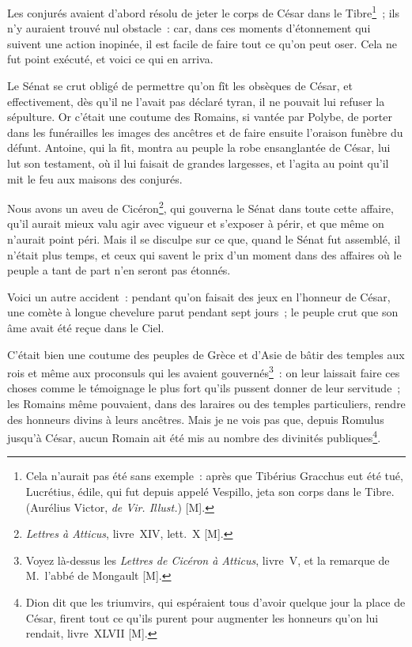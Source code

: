 \documentclass[french,twoside]{book} %
\begin{document}
Les conjurés avaient d’abord résolu de jeter le corps de César dans le Tibre\footnote{Cela n’aurait pas été sans exemple : après que Tibérius Gracchus eut été tué, Lucrétius, édile, qui fut depuis appelé Vespillo, jeta son corps dans le Tibre. (Aurélius Victor, {\itshape de Vir. Illust.}) [M].} ; ils n’y auraient trouvé nul obstacle : car, dans ces moments d’étonnement qui suivent une action inopinée, il est facile de faire tout ce qu’on peut oser. Cela ne fut point exécuté, et voici ce qui en arriva.\par
Le Sénat se crut obligé de permettre qu’on fît les obsèques de César, et effectivement, dès qu’il ne l’avait pas déclaré tyran, il ne pouvait lui refuser la sépulture. Or c’était une coutume des Romains, si vantée par Polybe, de porter dans les funérailles les images des ancêtres et de faire ensuite l’oraison funèbre du défunt. Antoine, qui la fit, montra au peuple la robe ensanglantée de César, lui lut son testament, où il lui faisait de grandes largesses, et l’agita au point qu’il mit le feu aux maisons des conjurés.\par
Nous avons un aveu de Cicéron\footnote{{\itshape Lettres à Atticus}, livre XIV, lett. X [M].}, qui gouverna le Sénat dans toute cette affaire, qu’il aurait mieux valu agir avec vigueur et s’exposer à périr, et que même on n’aurait point péri. Mais il se disculpe sur ce que, quand le Sénat fut assemblé, il n’était plus temps, et ceux qui savent le prix d’un moment dans des affaires où le peuple a tant de part n’en seront pas étonnés.\par
Voici un autre accident : pendant qu’on faisait des jeux en l’honneur de César, une comète à longue chevelure parut pendant sept jours ; le peuple crut que son âme avait été reçue dans le Ciel.\par
C’était bien une coutume des peuples de Grèce et d’Asie de bâtir des temples aux rois et même aux proconsuls qui les avaient gouvernés\footnote{Voyez là-dessus les {\itshape Lettres de Cicéron à Atticus}, livre V, et la remarque de M. l’abbé de Mongault [M].} : on leur laissait faire ces choses comme le témoignage le plus fort qu’ils pussent donner de leur servitude ; les Romains même pouvaient, dans des laraires ou des temples particuliers, rendre des honneurs divins à leurs ancêtres. Mais je ne vois pas que, depuis Romulus jusqu’à César, aucun Romain ait été mis au nombre des divinités publiques\footnote{Dion dit que les triumvirs, qui espéraient tous d’avoir quelque jour la place de César, firent tout ce qu’ils purent pour augmenter les honneurs qu’on lui rendait, livre XLVII [M].}.\par
\end{document}
